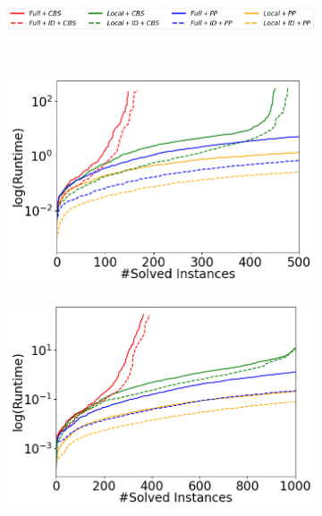\documentclass[letterpaper]{article} %
\def\
UrlFont{\rm}  %
\theoremstyle{definition}
\begin{document}
\begin{figure}[tbhp]
    \begin{subfigure}[b]{0.9\columnwidth}\centering  
      \includegraphics[width=\columnwidth]{Figures/legends_cactus_dashed_lines.png}
    \end{subfigure}\\
    \centering    
    \begin{subfigure}[b]{0.69\columnwidth}\centering  
      \includegraphics[width=\columnwidth]{Figures/maze/mixed_small_figures/cactus_with_dashed_lines.png}
    \end{subfigure}
    \begin{subfigure}[b]{0.69\columnwidth}\centering  
      \includegraphics[width=\columnwidth]{Figures/warehouse/mixed_small_figures/cactus_with_dashed_lines.png}

\end{subfigure}
\end{figure}
\end{document}

